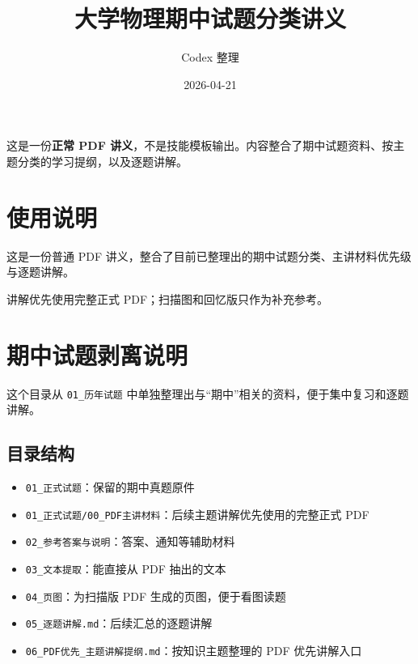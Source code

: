 \documentclass[12pt,a4paper]{ctexart}
\title{大学物理期中试题分类讲义}
\author{Codex 整理}
\date{2026-04-21}
\begin{document}
\maketitle
\begin{tcolorbox}[title=讲义定位]
这是一份\textbf{正常 PDF 讲义}，不是技能模板输出。内容整合了期中试题资料、按主题分类的学习提纲，以及逐题讲解。
\end{tcolorbox}

\tableofcontents
\clearpage

\section*{使用说明}

这是一份普通 PDF 讲义，整合了目前已整理出的期中试题分类、主讲材料优先级与逐题讲解。

讲解优先使用完整正式 PDF；扫描图和回忆版只作为补充参考。

\section{期中试题剥离说明}

这个目录从 \texttt{01\_历年试题} 中单独整理出与“期中”相关的资料，便于集中复习和逐题讲解。

\subsection{目录结构}

\begin{itemize}

\item \texttt{01\_正式试题}：保留的期中真题原件

\item \texttt{01\_正式试题/00\_PDF主讲材料}：后续主题讲解优先使用的完整正式 PDF

\item \texttt{02\_参考答案与说明}：答案、通知等辅助材料

\item \texttt{03\_文本提取}：能直接从 PDF 抽出的文本

\item \texttt{04\_页图}：为扫描版 PDF 生成的页图，便于看图读题

\item \texttt{05\_逐题讲解.md}：后续汇总的逐题讲解

\item \texttt{06\_PDF优先\_主题讲解提纲.md}：按知识主题整理的 PDF 优先讲解入口

\end{itemize}
\end{document}
